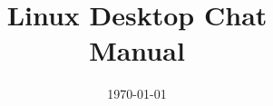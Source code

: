 \documentclass[11pt,a4paper,oneside]{report}
\begin{document}
\title{Linux Desktop Chat\\Manual}
\author{}
\date{\today}
\maketitle

\tableofcontents
\clearpage


\end{document}
